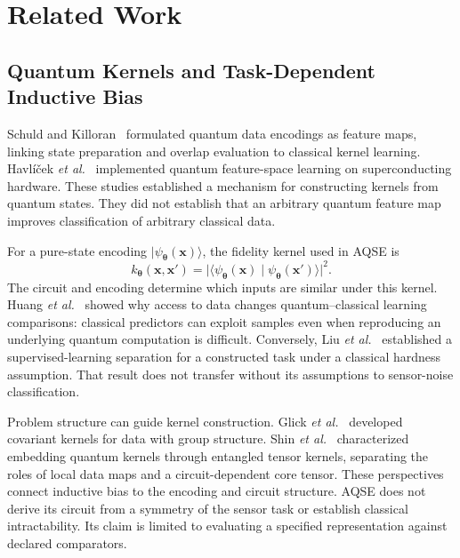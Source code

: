 \section{Related Work}
\label{sec:related_work}

\subsection{Quantum Kernels and Task-Dependent Inductive Bias}

Schuld and Killoran~\cite{schuld2019feature} formulated quantum data encodings as feature maps, linking state preparation and overlap evaluation to classical kernel learning. Havl\'{i}\v{c}ek \emph{et al.}~\cite{havlicek2019supervised} implemented quantum feature-space learning on superconducting hardware. These studies established a mechanism for constructing kernels from quantum states. They did not establish that an arbitrary quantum feature map improves classification of arbitrary classical data.

For a pure-state encoding $|\psi_{\boldsymbol{\theta}}(\mathbf{x})\rangle$, the fidelity kernel used in AQSE is
\begin{equation}
 k_{\boldsymbol{\theta}}(\mathbf{x},\mathbf{x}') =
 \bigl|\langle\psi_{\boldsymbol{\theta}}(\mathbf{x})
 \mid\psi_{\boldsymbol{\theta}}(\mathbf{x}')\rangle\bigr|^2.
 \label{eq:fidelity-kernel}
\end{equation}
The circuit and encoding determine which inputs are similar under this kernel. Huang \emph{et al.}~\cite{huang2021power} showed why access to data changes quantum--classical learning comparisons: classical predictors can exploit samples even when reproducing an underlying quantum computation is difficult. Conversely, Liu \emph{et al.}~\cite{liu2021rigorous} established a supervised-learning separation for a constructed task under a classical hardness assumption. That result does not transfer without its assumptions to sensor-noise classification.

Problem structure can guide kernel construction. Glick \emph{et al.}~\cite{glick2024covariant} developed covariant kernels for data with group structure. Shin \emph{et al.}~\cite{shin2026tensor} characterized embedding quantum kernels through entangled tensor kernels, separating the roles of local data maps and a circuit-dependent core tensor. These perspectives connect inductive bias to the encoding and circuit structure. AQSE does not derive its circuit from a symmetry of the sensor task or establish classical intractability. Its claim is limited to evaluating a specified representation against declared comparators.

